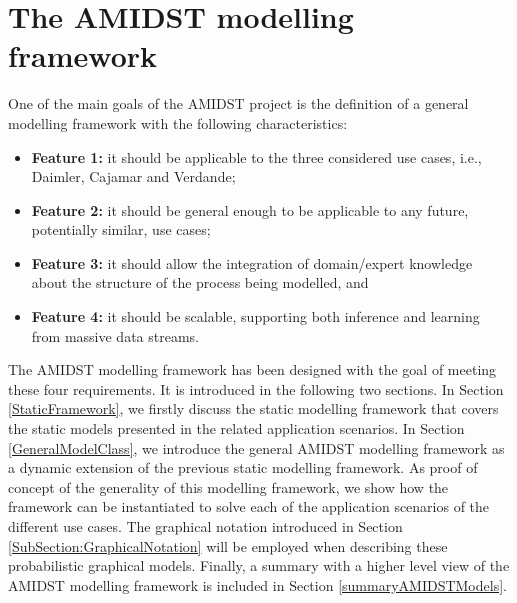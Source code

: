 \section{The AMIDST modelling framework}\label{section:AMIDSTmodelClass}

One of the main goals of the AMIDST project is the definition of a general modelling framework with the following characteristics: 

\begin{itemize}
\item \textbf{Feature 1:} it should be applicable to the three considered use cases, i.e., Daimler, Cajamar and Verdande;

\item \textbf{Feature 2:}  it should be general enough to be applicable to any future, potentially similar, use cases;

\item \textbf{Feature 3:} it should allow the integration of domain/expert knowledge about the structure of the process being modelled, and

\item \textbf{Feature 4:} it should be scalable, supporting both inference and learning from massive data streams.

\end{itemize}



The AMIDST modelling framework has been designed with the goal of meeting these four requirements. It is introduced in
the following two sections. In Section \ref{StaticFramework}, we firstly discuss the static modelling framework that
covers the static models presented in the related application scenarios. In Section \ref{GeneralModelClass}, we
introduce the general AMIDST modelling framework as a dynamic extension of the previous static modelling framework. As
proof of concept of the generality of this modelling framework, we show how the framework can be instantiated to solve each of the application scenarios of the different use cases. The graphical notation introduced in Section \ref{SubSection:GraphicalNotation} will be employed when describing these probabilistic graphical models. Finally, a summary with a higher level view of the AMIDST modelling framework is included in Section \ref{summaryAMIDSTModels}.

